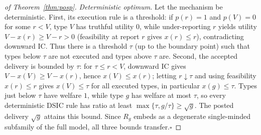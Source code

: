 \begin{proof}[of Theorem~\ref{thm:posp}]
\emph{Deterministic optimum.} Let the mechanism be deterministic. First,
its execution rule is a threshold: if $p(r)=1$ and $p(V)=0$ for some
$r<V$, type $V$ has truthful utility $0$, while under-reporting $r$ yields
utility $V-x(r)\ge V-r>0$ (feasibility at report $r$ gives $x(r)\le r$),
contradicting downward IC. Thus there is a threshold $\tau$ (up to the
boundary point) such that types below $\tau$ are not executed and types
above $\tau$ are. Second, the accepted delivery is bounded by $\tau$: for
$\tau\le r<V$, downward IC gives $V-x(V)\ge V-x(r)$, hence
$x(V)\le x(r)$; letting $r\downarrow\tau$ and using feasibility
$x(r)\le r$ gives $x(V)\le\tau$ for all executed types, in particular
$x(g)\le\tau$. Types just below $\tau$ have welfare $1$, while type $g$
has welfare at most $\tau$, so every deterministic DSIC rule has ratio at
least $\max\{\tau,g/\tau\}\ge\sqrt g$. The posted delivery $\sqrt g$
attains this bound. Since $R_g$ embeds as a degenerate single-minded
subfamily of the full model, all three bounds transfer.\hfill$\square$
\end{proof}

